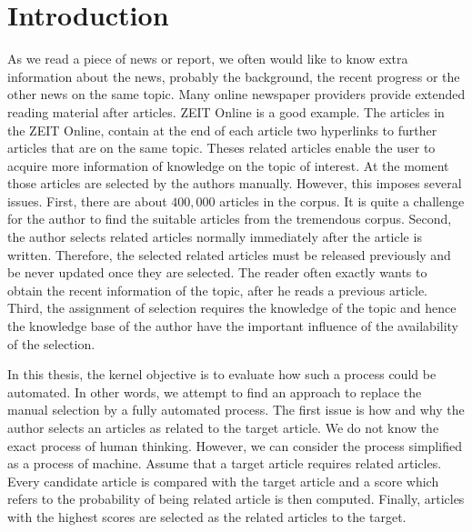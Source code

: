 \section{Introduction}

As we read a piece of news or report, we often would like to know extra information about the news, probably the background, the recent progress or the other news on the same topic. Many online newspaper providers provide extended reading material after articles. ZEIT Online is a good example. The articles in the ZEIT Online, contain at the end of each article two hyperlinks to further articles that are on the same topic. Theses related articles enable the user to acquire more information of knowledge on the topic of interest. At the moment those articles are selected by the authors manually. However, this imposes several issues. First, there are about $400,000$ articles in the corpus. It is quite a challenge for the author to find the suitable articles from the tremendous corpus. Second, the author selects related articles normally immediately after the article is written. Therefore, the selected related articles must be released previously and be never updated once they are selected. The reader often exactly wants to obtain the recent information of the topic, after he reads a previous article. Third, the assignment of selection requires the knowledge of the topic and hence the knowledge base of the author have the important influence of the availability of the selection.

In this thesis, the kernel objective is to evaluate how such a process could be automated. In other words, we attempt to find an approach to replace the manual selection by a fully automated process. The first issue is how and why the author selects an articles as related to the target article. We do not know the exact process of human thinking.  However, we can consider the process simplified as a process of machine. Assume that a target article requires related articles. Every candidate article is compared with the target article and a score which refers to the probability of being related article is then computed. Finally, articles with the highest scores are selected as the related articles to the target. 

